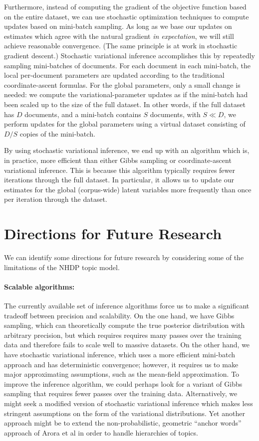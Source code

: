 \documentclass{article}
\begin{document}
Furthermore, instead of computing the gradient of the objective function based on the entire dataset, we can use stochastic optimization techniques to compute updates based on mini-batch sampling.
As long as we base our updates on estimates which agree with the natural gradient \emph{in expectation}, we will still achieve reasonable convergence.
(The same principle is at work in stochastic gradient descent.)
Stochastic variational inference accomplishes this by repeatedly sampling mini-batches of documents.
For each document in each mini-batch, the local per-document parameters are updated according to the traditional coordinate-ascent formulas.
For the global parameters, only a small change is needed: we compute the variational-parameter updates as if the mini-batch had been scaled up to the size of the full dataset.
In other words, if the full dataset has $D$ documents, and a mini-batch contains $S$ documents, with $S \ll D$, we perform updates for the global parameters using a virtual dataset consisting of $D / S$ copies of the mini-batch.

By using stochastic variational inference, we end up with an algorithm which is, in practice, more efficient than either Gibbs sampling or coordinate-ascent variational inference.
This is because this algorithm typically requires fewer iterations through the full dataset.
In particular, it allows us to update our estimates for the global (corpus-wide) latent variables more frequently than once per iteration through the dataset.

\section{Directions for Future Research}

We can identify some directions for future research by considering some of the limitations of the NHDP topic model.

\paragraph{Scalable algorithms:}
The currently available set of inference algorithms force us to make a significant tradeoff between precision and scalability.
On the one hand, we have Gibbs sampling, which can theoretically compute the true posterior distribution with arbitrary precision, but which requires requires many passes over the training data and therefore fails to scale well to massive datasets.
On the other hand, we have stochastic variational inference, which uses a more efficient mini-batch approach and has deterministic convergence; however, it requires us to make major approximating assumptions, such as the mean-field approximation.
To improve the inference algorithm, we could perhaps look for a variant of Gibbs sampling that requires fewer passes over the training data.
Alternatively, we might seek a modified version of stochastic variational inference which makes less stringent assumptions on the form of the variational distributions.
Yet another approach might be to extend the non-probabilistic, geometric ``anchor words'' approach of Arora et al \cite{arora2013practical} in order to handle hierarchies of topics.
\end{document}
